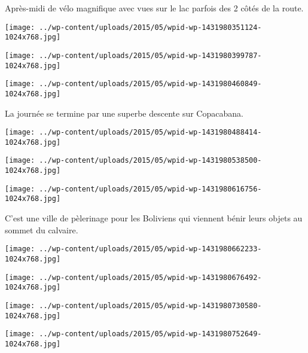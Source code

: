 Après-midi de vélo magnifique avec vues sur le lac parfois des 2 côtés de la route. 
\begin{center} \texttt{[image: ../wp-content/uploads/2015/05/wpid-wp-1431980351124-1024x768.jpg]} \end{center}

\begin{center} \texttt{[image: ../wp-content/uploads/2015/05/wpid-wp-1431980399787-1024x768.jpg]} \end{center}
\begin{center} \texttt{[image: ../wp-content/uploads/2015/05/wpid-wp-1431980460849-1024x768.jpg]} \end{center}
\pagebreak

La journée se termine par une superbe descente sur Copacabana. 
\begin{center} \texttt{[image: ../wp-content/uploads/2015/05/wpid-wp-1431980488414-1024x768.jpg]} \end{center}
\begin{center} \texttt{[image: ../wp-content/uploads/2015/05/wpid-wp-1431980538500-1024x768.jpg]} \end{center}

\begin{center} \texttt{[image: ../wp-content/uploads/2015/05/wpid-wp-1431980616756-1024x768.jpg]} \end{center}

C'est une ville de pèlerinage pour les Boliviens qui viennent bénir leurs objets au sommet du calvaire. 
\begin{center} \texttt{[image: ../wp-content/uploads/2015/05/wpid-wp-1431980662233-1024x768.jpg]} \end{center}

\begin{center} \texttt{[image: ../wp-content/uploads/2015/05/wpid-wp-1431980676492-1024x768.jpg]} \end{center}
\begin{center} \texttt{[image: ../wp-content/uploads/2015/05/wpid-wp-1431980730580-1024x768.jpg]} \end{center}

\begin{center} \texttt{[image: ../wp-content/uploads/2015/05/wpid-wp-1431980752649-1024x768.jpg]} \end{center}

